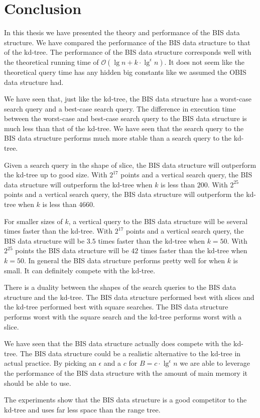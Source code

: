\chapter{Conclusion}
\label{ch:conclusion}

In this thesis we have presented the theory and performance of the BIS data structure. We have compared the performance of the BIS data structure to that of the kd-tree. The performance of the BIS data structure corresponds well with the theoretical running time of $\mathcal{O}(\lg n + k\cdot\lg^\epsilon n)$. It does not seem like the theoretical query time has any hidden big constants like we assumed the OBIS data structure had.

We have seen that, just like the kd-tree, the BIS data structure has a worst-case search query and a best-case search query. The difference in execution time between the worst-case and best-case search query to the BIS data structure is much less than that of the kd-tree. We have seen that the search query to the BIS data structure performs much more stable than a search query to the kd-tree.

Given a search query in the shape of slice, the BIS data structure will outperform the kd-tree up to good size. With $2^{17}$ points and a vertical search query, the BIS data structure will outperform the kd-tree when $k$ is less than $200$. With $2^{25}$ points and a vertical search query, the BIS data structure will outperform the kd-tree when $k$ is less than $4660$. 

For smaller sizes of $k$, a vertical query to the BIS data structure will be several times faster than the kd-tree. With $2^{17}$ points and a vertical search query, the BIS data structure will be $3.5$ times faster than the kd-tree when $k = 50$. With $2^{25}$ points the BIS data structure will be $42$ times faster than the kd-tree when $k = 50$. In general the BIS data structure performs pretty well for when $k$ is small. It can definitely compete with the kd-tree.

There is a duality between the shapes of the search queries to the BIS data structure and the kd-tree. The BIS data structure performed best with slices and the kd-tree performed best with square searches. The BIS data structure performs worst with the square search and the kd-tree performs worst with a slice.

We have seen that the BIS data structure actually does compete with the kd-tree. The BIS data structure could be a realistic alternative to the kd-tree in actual practice. By picking an $\epsilon$ and a $c$ for $B = c\cdot\lg^\epsilon n$ we are able to leverage the performance of the BIS data structure with the amount of main memory it should be able to use.

The experiments show that the BIS data structure is a good competitor to the kd-tree and uses far less space than the range tree.

